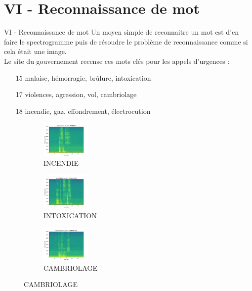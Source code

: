 \documentclass[10pt]{beamer}
\begin{document}
\section{VI - Reconnaissance de mot}
\begin{frame}{VI - Reconnaissance de mot}
Un moyen simple de reconnaitre un mot est d'en faire le spectrogramme puis de résoudre le problème de reconnaissance comme si cela était une image. \\
Le site du gouvernement recense ces mots clés pour les appels d'urgences : \\
\begin{enumerate}
  \item[15] malaise, hémorragie, brûlure, intoxication
  \item[17] violences, agression, vol, cambriolage
  \item[18] incendie, gaz, effondrement, électrocution
\end{enumerate}
\begin{figure}
	\begin{subfigure}[]{0.3\textwidth}
		\includegraphics[width=90px]{1-Incendie.jpg}
  		\caption{INCENDIE}
	\end{subfigure}
	\begin{subfigure}[]{0.3\textwidth}
		\includegraphics[width=90px]{1-Intoxication.jpg}
  		\caption{INTOXICATION}
	\end{subfigure}
	\begin{subfigure}[]{0.3\textwidth}
		\includegraphics[width=90px]{1-Cambriolage.jpg}
		\caption{CAMBRIOLAGE}
	\end{subfigure}
\end{figure}
\end{frame}
\end{document}

